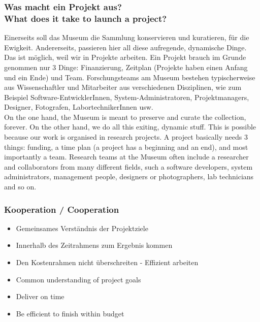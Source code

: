 \documentclass[12pt]{beamer}
\begin{document}
{\scriptsize
\begin{frame}
  \frametitle{Was macht ein Projekt aus? \\ \textcolor{mfn_green}{What does it take to launch a project?}}
  Einerseits soll das Museum die Sammlung konservieren und kuratieren, für die Ewigkeit. Andererseits, passieren hier all diese aufregende, dynamische Dinge. Das ist möglich, weil wir in Projekte arbeiten. Ein Projekt brauch im Grunde genommen nur 3 Dinge: Finanzierung, Zeitplan (Projekte haben einen Anfang und ein Ende) und Team. Forschungsteams am Museum bestehen typischerweise aus Wissenschaftler und Mitarbeiter aus verschiedenen Disziplinen, wie zum Beispiel Software-EntwicklerInnen, System-Administratoren, Projektmanagers, Designer, Fotografen, LabortechnikerInnen usw.\\
  \bigskip
  \textcolor{mfn_green}{On the one hand, the Museum is meant to preserve and curate the collection, forever. On the other hand, we do all this exiting, dynamic stuff. This is possible because our work is organised in research projects. A project basically needs 3 things: funding, a time plan (a project has a beginning and an end), and most importantly a team. Research teams at the Museum often include a researcher and collaborators from many different fields, such a software developers, system administrators, management people, designers or photographers, lab technicians and so on.}
\end{frame}
}
\begin{frame}
  \frametitle{Kooperation / \textcolor{mfn_green}{Cooperation}}

  \begin{itemize}
  \item{Gemeinsames Verständnis der Projektziele}
  \item{Innerhalb des Zeitrahmens zum Ergebnis kommen}
  \item{Den Kostenrahmen nicht überschreiten - Effizient arbeiten}
  \end{itemize}
  
  \begin{itemize}
  \item{\textcolor{mfn_green}{Common understanding of project goals}}
  \item{\textcolor{mfn_green}{Deliver on time}}
  \item{\textcolor{mfn_green}{Be efficient to finish within budget}}
  \end{itemize}
\end{frame}
\end{document}
